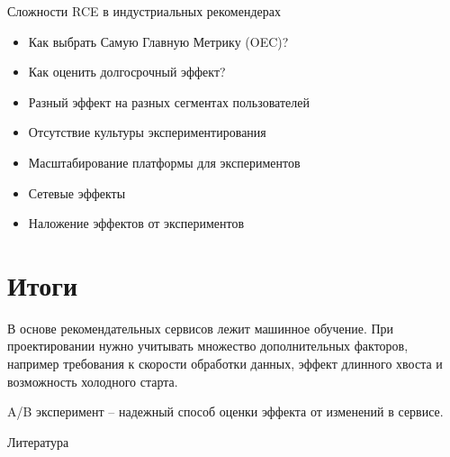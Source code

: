 \documentclass[11pt,aspectratio=169,handout]{beamer}
\begin{document}
\begin{frame}{Сложности RCE в индустриальных рекомендерах \cite{FACEBOOK}}

\begin{itemize}[<+->]
\item Как выбрать Самую Главную Метрику (OEC)? 
\item Как оценить долгосрочный эффект?
\item Разный эффект на разных сегментах пользователей
\item Отсутствие культуры экспериментирования
\item Масштабирование платформы для экспериментов
\item Сетевые эффекты
\item Наложение эффектов от экспериментов
\end{itemize}

\end{frame}

\section{Итоги}

\begin{frame}

\begin{tcolorbox}[colback=info!5,colframe=info!80]
В основе рекомендательных сервисов лежит машинное обучение. При проектировании  нужно учитывать множество дополнительных факторов, например требования к скорости обработки данных, эффект длинного хвоста и возможность холодного старта.
\end{tcolorbox}
\vfill
\begin{tcolorbox}[colback=info!5,colframe=info!80]
A/B эксперимент -- надежный способ оценки эффекта от изменений в сервисе.
\end{tcolorbox}

\end{frame}

\begin{frame}[allowframebreaks]{Литература}


\end{frame}
\end{document}
